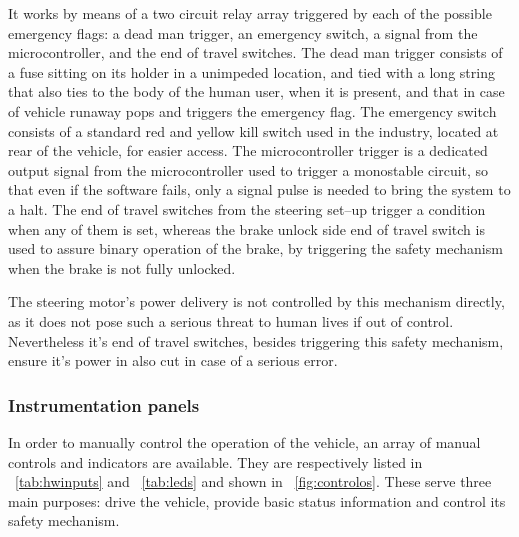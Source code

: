 \documentclass[journal]{IEEEtran}
\begin{document}
It works by means of a two circuit relay array triggered by each of the possible emergency flags: a dead man trigger, an emergency switch, a signal from the microcontroller, and the end of travel switches. The dead man trigger consists of a fuse sitting on its holder in a unimpeded location, and tied with a long string that also ties to the body of the human user, when it is present, and that in case of vehicle runaway pops and triggers the emergency flag. The emergency switch consists of a standard red and yellow kill switch used in the industry, located at rear of the vehicle, for easier access. The microcontroller trigger is a dedicated output signal from the microcontroller used to trigger a monostable circuit, so that even if the software fails, only a signal pulse is needed to bring the system to a halt. The end of travel switches from the steering set--up trigger a condition when any of them is set, whereas the brake unlock side end of travel switch is used to assure binary operation of the brake, by triggering the safety mechanism when the brake is not fully unlocked.

The steering motor's power delivery is not controlled by this mechanism directly, as it does not pose such a serious threat to human lives if out of control. Nevertheless it's end of travel switches, besides triggering this safety mechanism, ensure it's power in also cut in case of a serious error.

\subsubsection{Instrumentation panels}

In order to manually control the operation of the vehicle, an array of manual controls and indicators are available. They are respectively listed in \tablename~\ref{tab:hwinputs} and \tablename~\ref{tab:leds} and shown in \figurename~\ref{fig:controlos}. These serve three main purposes: drive the vehicle, provide basic status information and control its safety mechanism.
\end{document}
